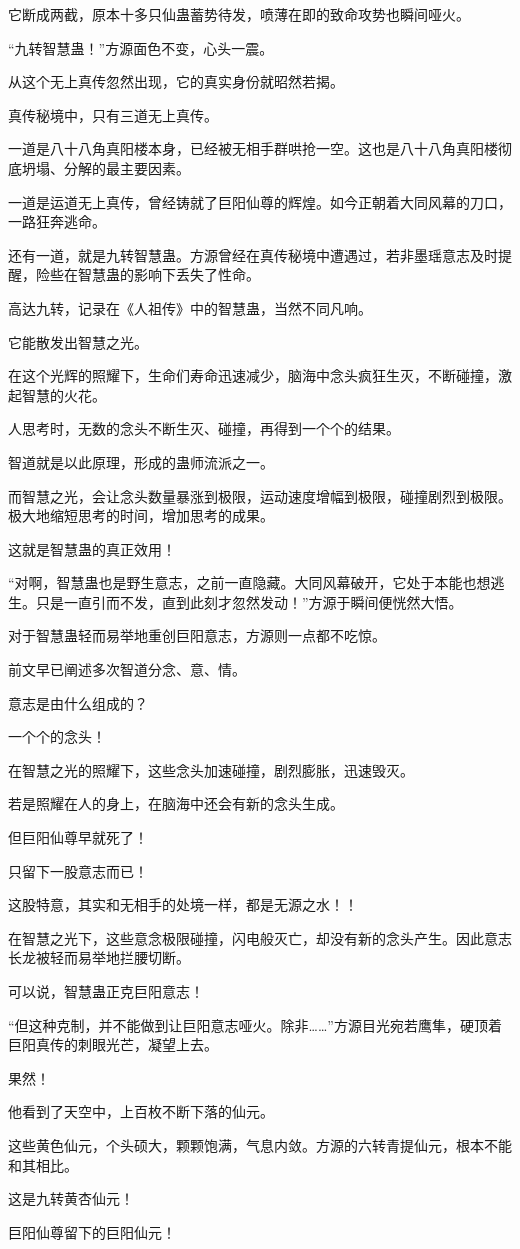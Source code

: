 \begin{this_body}
它断成两截，原本十多只仙蛊蓄势待发，喷薄在即的致命攻势也瞬间哑火。

“九转智慧蛊！”方源面色不变，心头一震。

从这个无上真传忽然出现，它的真实身份就昭然若揭。

真传秘境中，只有三道无上真传。

一道是八十八角真阳楼本身，已经被无相手群哄抢一空。这也是八十八角真阳楼彻底坍塌、分解的最主要因素。

一道是运道无上真传，曾经铸就了巨阳仙尊的辉煌。如今正朝着大同风幕的刀口，一路狂奔逃命。

还有一道，就是九转智慧蛊。方源曾经在真传秘境中遭遇过，若非墨瑶意志及时提醒，险些在智慧蛊的影响下丢失了性命。

高达九转，记录在《人祖传》中的智慧蛊，当然不同凡响。

它能散发出智慧之光。

在这个光辉的照耀下，生命们寿命迅速减少，脑海中念头疯狂生灭，不断碰撞，激起智慧的火花。

人思考时，无数的念头不断生灭、碰撞，再得到一个个的结果。

智道就是以此原理，形成的蛊师流派之一。

而智慧之光，会让念头数量暴涨到极限，运动速度增幅到极限，碰撞剧烈到极限。极大地缩短思考的时间，增加思考的成果。

这就是智慧蛊的真正效用！

“对啊，智慧蛊也是野生意志，之前一直隐藏。大同风幕破开，它处于本能也想逃生。只是一直引而不发，直到此刻才忽然发动！”方源于瞬间便恍然大悟。

对于智慧蛊轻而易举地重创巨阳意志，方源则一点都不吃惊。

前文早已阐述多次智道分念、意、情。

意志是由什么组成的？

一个个的念头！

在智慧之光的照耀下，这些念头加速碰撞，剧烈膨胀，迅速毁灭。

若是照耀在人的身上，在脑海中还会有新的念头生成。

但巨阳仙尊早就死了！

只留下一股意志而已！

这股特意，其实和无相手的处境一样，都是无源之水！！

在智慧之光下，这些意念极限碰撞，闪电般灭亡，却没有新的念头产生。因此意志长龙被轻而易举地拦腰切断。

可以说，智慧蛊正克巨阳意志！

“但这种克制，并不能做到让巨阳意志哑火。除非……”方源目光宛若鹰隼，硬顶着巨阳真传的刺眼光芒，凝望上去。

果然！

他看到了天空中，上百枚不断下落的仙元。

这些黄色仙元，个头硕大，颗颗饱满，气息内敛。方源的六转青提仙元，根本不能和其相比。

这是九转黄杏仙元！

巨阳仙尊留下的巨阳仙元！

\end{this_body}

